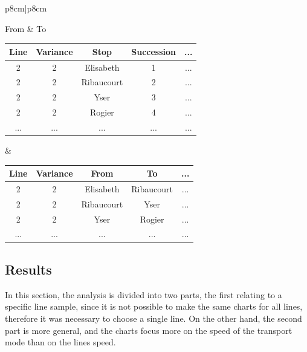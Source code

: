 \documentclass{article}
\begin{document}
\begin{tabular}{p{8cm}|p{8cm}}

\hspace{3cm} From & \hspace{3cm} To \\

\begin{center}
\begin{tabular}{|c|c|c|c|c|} 
 \hline
 Line & Variance & Stop & Succession & ...\\ [0.5ex]
 \hline\hline
 2 & 2 & Elisabeth & 1 & ... \\ 
 \hline
 2 & 2 & Ribaucourt & 2 & ... \\
 \hline
 2 & 2 & Yser & 3 & ... \\
 \hline
 2 & 2 & Rogier & 4 & ... \\
 \hline
 ... & ... & ... & ... & ... \\
 \hline
\end{tabular}
\end{center}


&

\vspace{0.3cm}

\begin{center}
\begin{tabular}{|c|c|c|c|c|} 
 \hline
 Line & Variance & From & To & ...\\ [0.5ex]
 \hline\hline
 2 & 2 & Elisabeth & Ribaucourt & ... \\ 
 \hline
 2 & 2 & Ribaucourt & Yser & ... \\
 \hline
 2 & 2 & Yser & Rogier & ... \\
 \hline
 ... & ... & ... & ... & ... \\
 \hline
\end{tabular}
\end{center}

\end{tabular}

\subsection{Results}

In this section, the analysis is divided into two parts, the first relating to a specific line sample, since it is not possible to make the same charts for all lines, therefore it was necessary to choose a single line. On the other hand, the second part is more general, and the charts focus more on the speed of the transport mode than on the lines speed.
\end{document}
